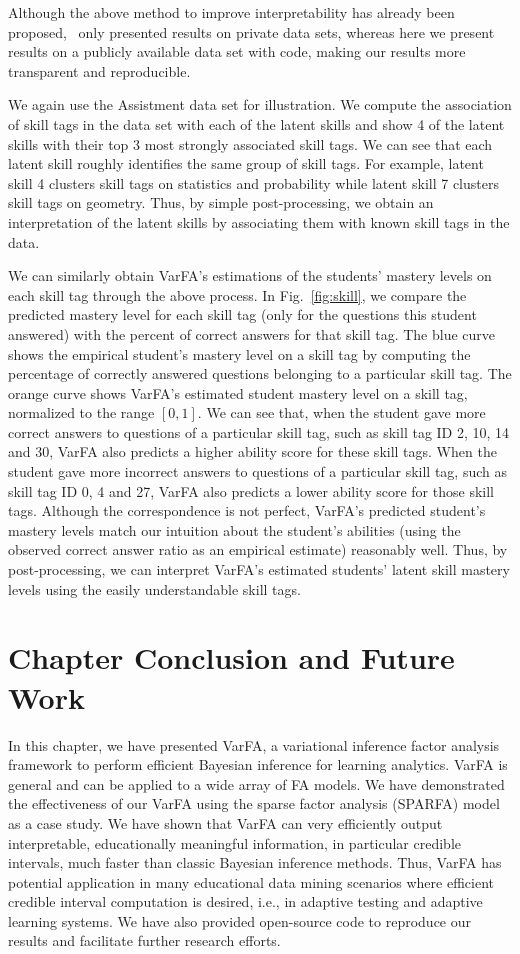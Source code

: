 Although the above method to improve interpretability has already been
proposed,~\cite{lan14a} only presented results on private data sets, whereas
here we present results on a publicly available data set with code, making our
results more transparent and reproducible.

We again use the Assistment data set for illustration. We compute the
association of skill tags in the data set with each of the latent skills and
show 4 of the latent skills with their top 3 most strongly associated skill
tags. We can see that each latent skill roughly identifies the same group of
skill tags. For example, latent skill 4 clusters skill tags on statistics and
probability while latent skill 7 clusters skill tags on geometry. Thus, by
simple post-processing, we obtain an interpretation of the latent skills by
associating them with known skill tags in the data.

We can similarly obtain VarFA's estimations of the students' mastery levels on
each skill tag through the above process. In Fig.~\ref{fig:skill}, we compare
the predicted mastery level for each skill tag (only for the questions this
student answered) with the percent of correct answers for that skill tag. The blue
curve shows the empirical student's mastery level on a skill tag by computing
the percentage of correctly answered questions belonging to a particular skill
tag. The orange curve shows VarFA's estimated student mastery level on a skill tag,
normalized to the range $[0,1]$.
%
We can see that, when the student gave more correct answers to questions of a
particular skill tag, such as skill tag ID 2, 10, 14 and 30, VarFA also
predicts a higher ability score for these skill tags. When the student gave
more incorrect answers to questions of a particular skill tag, such as skill
tag ID 0, 4 and 27, VarFA also predicts a lower ability score for those skill
tags. Although the correspondence is not perfect, VarFA's predicted student's
mastery levels match our intuition about the student's abilities (using the
observed correct answer ratio as an empirical estimate) reasonably well. Thus,
by post-processing, we can interpret VarFA's estimated students' latent skill
mastery levels using the easily understandable skill tags.
\section{Chapter Conclusion and Future Work}
\label{sec:conclusion}
In this chapter, we have presented VarFA, a variational inference factor analysis framework to perform efficient Bayesian inference for learning analytics. VarFA is general and can be applied to a wide array of FA models. We have demonstrated the effectiveness of our VarFA using the sparse factor analysis (SPARFA) model as a case study. We have shown that VarFA can very efficiently output interpretable, educationally meaningful information, in particular credible intervals, much faster than classic Bayesian inference methods. Thus, VarFA has potential application in many educational data mining scenarios where efficient credible interval computation is desired, i.e., in adaptive testing and adaptive learning systems. We have also provided open-source code to reproduce our results and facilitate further research efforts.

